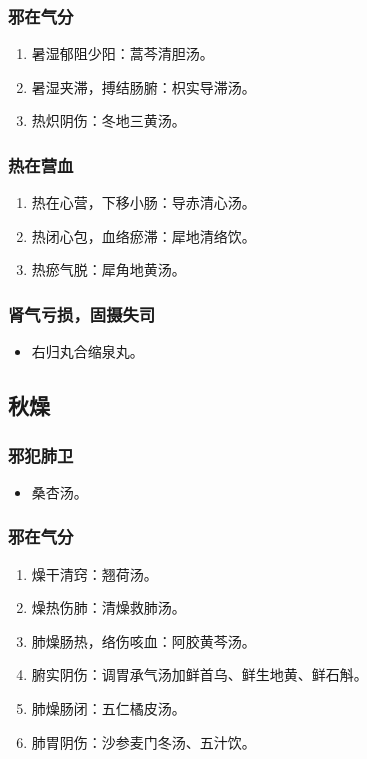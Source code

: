 \documentclass[cn,black,12pt,founder,normal,twocolumn]{elegantnote}
\begin{document}
\subsubsection{邪在气分}

\begin{enumerate}
    \item 暑湿郁阻少阳：蒿芩清胆汤。
    \item 暑湿夹滞，搏结肠腑：枳实导滞汤。
    \item 热炽阴伤：冬地三黄汤。
\end{enumerate}

\subsubsection{热在营血}

\begin{enumerate}
    \item 热在心营，下移小肠：导赤清心汤。
    \item 热闭心包，血络瘀滞：犀地清络饮。
    \item 热瘀气脱：犀角地黄汤。
\end{enumerate}

\subsubsection{肾气亏损，固摄失司}

\begin{itemize}
    \item 右归丸合缩泉丸。
\end{itemize}

\subsection{秋燥}

\subsubsection{邪犯肺卫}

\begin{itemize}
    \item 桑杏汤。
\end{itemize}

\subsubsection{邪在气分}

\begin{enumerate}
    \item 燥干清窍：翘荷汤。
    \item 燥热伤肺：清燥救肺汤。
    \item 肺燥肠热，络伤咳血：阿胶黄芩汤。
    \item 腑实阴伤：调胃承气汤加鲜首乌、鲜生地黄、鲜石斛。
    \item 肺燥肠闭：五仁橘皮汤。
    \item 肺胃阴伤：沙参麦门冬汤、五汁饮。
\end{enumerate}
\end{document}
